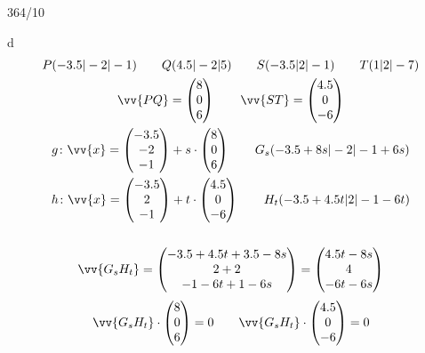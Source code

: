 \begin{exercise}{364/10}
  \item [d]
  \begin{gather*}
    P(-3.5|-2|-1) \qquad Q(4.5|-2|5) \qquad S(-3.5|2|-1) \qquad T(1|2|-7) \\
    \vv{PQ} = \begin{pmatrix}8 \\ 0 \\ 6\end{pmatrix} \qquad \vv{ST} = \begin{pmatrix}4.5 \\ 0 \\ -6\end{pmatrix} \\
    g \colon \vv{x} = \begin{pmatrix}-3.5 \\ -2 \\ -1\end{pmatrix} + s \cdot \begin{pmatrix}8 \\ 0 \\ 6\end{pmatrix} \qquad G_s(-3.5 + 8s|-2|-1 + 6s) \\
    h \colon \vv{x} = \begin{pmatrix}-3.5 \\ 2 \\ -1\end{pmatrix} + t \cdot \begin{pmatrix}4.5 \\ 0 \\ -6\end{pmatrix} \qquad H_t(-3.5 + 4.5t|2|-1 - 6t) \\\\
    \vv{G_sH_t} = \begin{pmatrix}-3.5 + 4.5t + 3.5 - 8s \\ 2 + 2 \\ -1 - 6t + 1 - 6s\end{pmatrix} = \begin{pmatrix}4.5t - 8s \\ 4 \\ -6t - 6s\end{pmatrix}
  \end{gather*}
  \begin{gather*}
    \vv{G_sH_t} \cdot \begin{pmatrix}8 \\ 0 \\ 6\end{pmatrix} = 0 \qquad \vv{G_sH_t} \cdot \begin{pmatrix}4.5 \\ 0 \\ -6\end{pmatrix} = 0 \\

\end{gather*}
\end{exercise}
